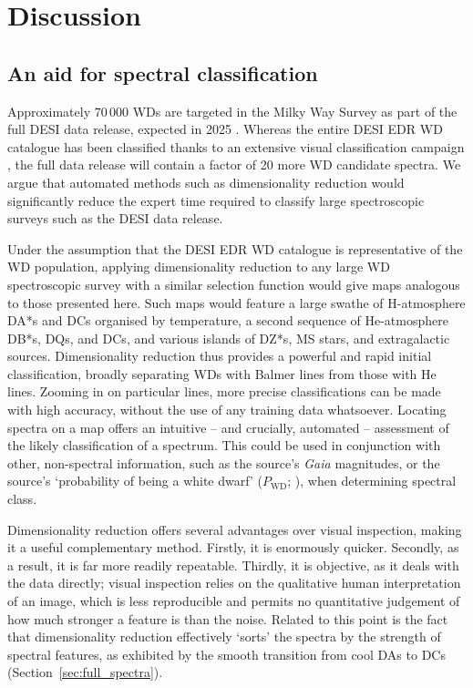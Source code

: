 \documentclass[fleqn,usenatbib]{mnras}
\begin{document}
\section{Discussion}
\label{sec:discussion}

\subsection{An aid for spectral classification}

Approximately $70\,000$ WDs are targeted in the Milky Way Survey as part of the full DESI data release, expected in 2025 \citep{cooper23}.
Whereas the entire DESI EDR WD catalogue has been classified thanks to an extensive visual classification campaign \citep{manser24}, the full data release will contain a factor of 20 more WD candidate spectra.
We argue that automated methods such as dimensionality reduction would significantly reduce the expert time required to classify large spectroscopic surveys such as the DESI data release.

Under the assumption that the DESI EDR WD catalogue is representative of the WD population, applying dimensionality reduction to any large WD spectroscopic survey with a similar selection function would give maps analogous to those presented here.
Such maps would feature a large swathe of H-atmosphere DA*s and DCs organised by temperature, a second sequence of He-atmosphere DB*s, DQs, and DCs, and various islands of DZ*s, MS stars, and extragalactic sources.
Dimensionality reduction thus provides a powerful and rapid initial classification, broadly separating WDs with Balmer lines from those with He lines.
Zooming in on particular lines, more precise classifications can be made with high accuracy, without the use of any training data whatsoever.
Locating spectra on a map offers an intuitive -- and crucially, automated -- assessment of the likely classification of a spectrum.
This could be used in conjunction with other, non-spectral information, such as the source's \textit{Gaia} magnitudes, or the source's `probability of being a white dwarf' ($P_\text{WD}$; \citealt{gentilefusillo15}), when determining spectral class.

Dimensionality reduction offers several advantages over visual inspection, making it a useful complementary method.
Firstly, it is enormously quicker.
Secondly, as a result, it is far more readily repeatable.
Thirdly, it is objective, as it deals with the data directly; visual inspection relies on the qualitative human interpretation of an image, which is less reproducible and permits no quantitative judgement of how much stronger a feature is than the noise.
Related to this point is the fact that dimensionality reduction effectively `sorts' the spectra by the strength of spectral features, as exhibited by the smooth transition from cool DAs to DCs (Section~\ref{sec:full_spectra}).
\end{document}
